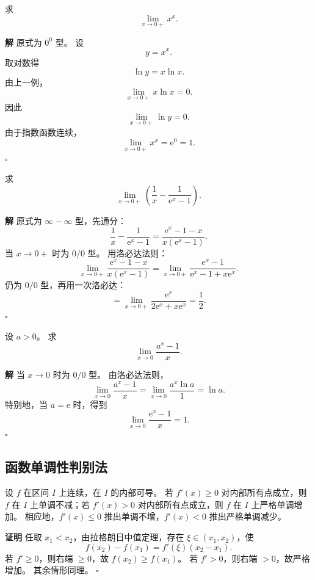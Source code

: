 \documentclass[fontset=fandol]{ctexart}
\newenvironment{proofdetail}{\par\noindent\textbf{证明}\quad}{\hfill$\square$\par\vspace{0.8em}}
\newenvironment{solution}{\par\noindent\textbf{解}\quad}{\hfill$\square$\par\vspace{0.8em}}
\newcommand{\ee}{\mathrm{e}}
\begin{document}
\begin{example}[指数型未定式]
求
\[
\lim_{x\to0+}x^x.
\]
\end{example}
\begin{solution}
原式为 $0^0$ 型。 设
\[
y=x^x.
\]
取对数得
\[
\ln y=x\ln x.
\]
由上一例，
\[
\lim_{x\to0+}x\ln x=0.
\]
因此
\[
\lim_{x\to0+}\ln y=0.
\]
由于指数函数连续，
\[
\lim_{x\to0+}x^x=\ee^0=1.
\]
\end{solution}

\begin{example}[差型未定式]
求
\[
\lim_{x\to0+}\left(\frac1x-\frac1{\ee^x-1}\right).
\]
\end{example}
\begin{solution}
原式为 $\infty-\infty$ 型，先通分：
\[
\frac1x-\frac1{\ee^x-1}
=\frac{\ee^x-1-x}{x(\ee^x-1)}.
\]
当 $x\to0+$ 时为 $0/0$ 型。 用洛必达法则：
\[
\lim_{x\to0+}\frac{\ee^x-1-x}{x(\ee^x-1)}
=\lim_{x\to0+}\frac{\ee^x-1}{\ee^x-1+x\ee^x}.
\]
仍为 $0/0$ 型，再用一次洛必达：
\[
=\lim_{x\to0+}\frac{\ee^x}{2\ee^x+x\ee^x}
=\frac12.
\]
\end{solution}

\begin{example}[参数型极限]
设 $a>0$。 求
\[
\lim_{x\to0}\frac{a^x-1}{x}.
\]
\end{example}
\begin{solution}
当 $x\to0$ 时为 $0/0$ 型。 由洛必达法则，
\[
\lim_{x\to0}\frac{a^x-1}{x}
=\lim_{x\to0}\frac{a^x\ln a}{1}
=\ln a.
\]
特别地，当 $a=\ee$ 时，得到
\[
\lim_{x\to0}\frac{\ee^x-1}{x}=1.
\]
\end{solution}

\subsection{函数单调性判别法}

\begin{theorem}[单调性判别法]
设 $f$ 在区间 $I$ 上连续，在 $I$ 的内部可导。 若 $f'(x)\geq0$ 对内部所有点成立，则 $f$ 在 $I$ 上单调不减；若 $f'(x)>0$ 对内部所有点成立，则 $f$ 在 $I$ 上严格单调增加。 相应地，$f'(x)\leq0$ 推出单调不增，$f'(x)<0$ 推出严格单调减少。
\end{theorem}
\begin{proofdetail}
任取 $x_1<x_2$，由拉格朗日中值定理，存在 $\xi\in(x_1,x_2)$，使
\[
f(x_2)-f(x_1)=f'(\xi)(x_2-x_1).
\]
若 $f'\geq0$，则右端 $\geq0$，故 $f(x_2)\geq f(x_1)$。 若 $f'>0$，则右端 $>0$，故严格增加。 其余情形同理。
\end{proofdetail}
\end{document}
